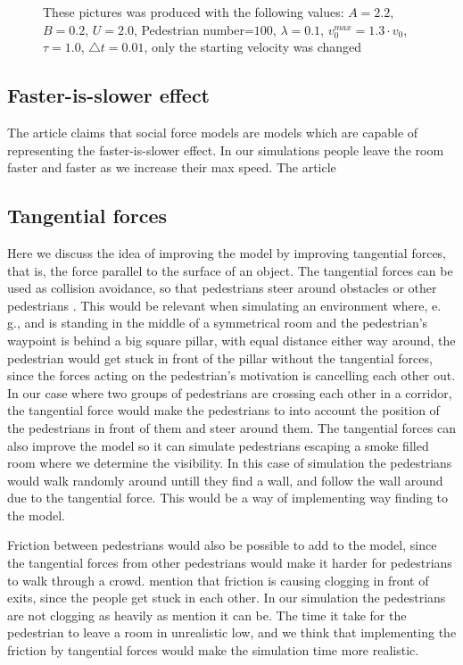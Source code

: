 \begin{figure}
\caption{These pictures was produced with the following values: $A=2.2$, $B=0.2$, $U=2.0$, Pedestrian number=$100$, $\lambda=0.1$, $v^{max}_0=1.3 \cdot v_0$, $\tau = 1.0$, $\triangle t = 0.01$, only the starting velocity was changed}
\label{fig:problemSenario}
\end{figure}
\subsection{Faster-is-slower effect}
The article \cite{self-org} claims that social force models are models which are capable of representing the faster-is-slower effect. In our simulations people leave the room faster and faster as we increase their max speed. The article 

\subsection{Tangential forces}
Here we discuss the idea of improving the model by improving tangential forces, that is, the force parallel to the surface of an object.
The tangential forces can be used as collision avoidance, so that pedestrians steer around obstacles or other pedestrians \cite{tang}.
This would be relevant when simulating an environment where, e. g., and is standing in the middle of a symmetrical room and the pedestrian's waypoint
is behind a big square pillar, with equal distance either way around, the pedestrian would get stuck in front of the pillar without the tangential forces,
since the forces acting on the pedestrian's motivation is cancelling each other out. 
In our case where two groups of pedestrians are crossing each other in a corridor, the tangential force would make the pedestrians to into account
the position of the pedestrians in front of them and steer around them.
The tangential forces can also improve the model so it can simulate pedestrians escaping a smoke filled room where we determine the visibility.
In this case of simulation the pedestrians would walk randomly around untill they find a wall, and follow the wall around due to the tangential force.
This would be a way of implementing way finding to the model.

Friction between pedestrians would also be possible to add to the model, since the tangential forces from other pedestrians would make it
harder for pedestrians to walk through a crowd. \cite{self-org} mention that friction is causing clogging in front of exits, since the people
get stuck in each other. In our simulation the pedestrians are not clogging as heavily as \cite{self-org} mention it can be.
The time it take for the pedestrian to leave a room in unrealistic low, and we think that implementing the friction by tangential forces
would make the simulation time more realistic.

